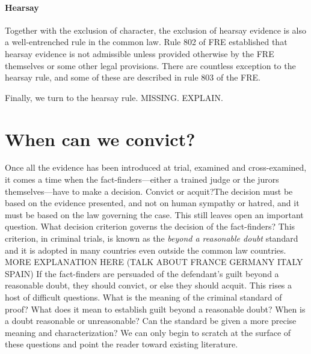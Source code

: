 \documentclass[10pt]{article}
\begin{document}
\paragraph{Hearsay} Together with the exclusion of character, the exclusion of hearsay 
evidence is also a well-entrenched rule in the common law. Rule 802 of FRE established that hearsay evidence is 
not admissible unless provided otherwise by the FRE themselves or some other legal provisions. 
There are countless exception to the hearsay rule, and some of these are described in rule 803 of the FRE. 







Finally, we turn to the hearsay rule.  MISSING. EXPLAIN. 

\section{When can we convict?}



Once all the evidence has been introduced at trial, examined and cross-examined, it comes a time when the fact-finders---either a trained judge or the jurors themselves---have 
to make a decision. Convict or acquit?The decision must be based on the evidence presented, and not on human sympathy or hatred, and it must be based 
on the law governing the case. This still leaves open an important question. What decision criterion governs the decision of the fact-finders? This criterion, in criminal trials, is known as the \textit{beyond a reasonable doubt} standard and it is adopted in many countries even outside the common law countries. MORE EXPLANATION HERE (TALK ABOUT FRANCE GERMANY ITALY SPAIN) 
If the fact-finders are persuaded of the defendant's guilt beyond a reasonable doubt, they should convict, or else they should acquit. This rises a host of difficult questions. What is the meaning of the criminal standard of proof? What does  it mean to establish guilt beyond a reasonable doubt? When is a doubt reasonable or unreasonable? Can the standard be given a more precise meaning and characterization? We can only begin to scratch at the surface of these questions and point the reader toward existing literature. 
  
\end{document}
